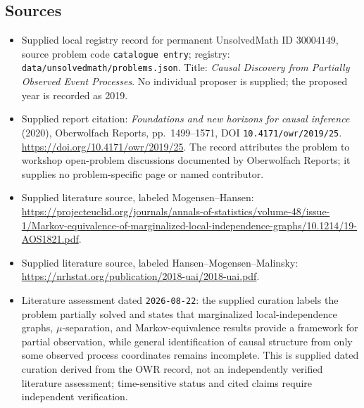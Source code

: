 \documentclass[11pt]{article}
\begin{document}
\subsection{Sources}
\begin{itemize}
\item Supplied local registry record for permanent UnsolvedMath ID \(30004149\), source problem code \texttt{catalogue entry}; registry: \texttt{data/unsolvedmath/problems.json}. Title: \emph{Causal Discovery from Partially Observed Event Processes}. No individual proposer is supplied; the proposed year is recorded as 2019.
\item Supplied report citation: \emph{Foundations and new horizons for causal inference} (2020), Oberwolfach Reports, pp.\ 1499--1571, DOI \texttt{10.4171/owr/2019/25}. \url{https://doi.org/10.4171/owr/2019/25}. The record attributes the problem to workshop open-problem discussions documented by Oberwolfach Reports; it supplies no problem-specific page or named contributor.
\item Supplied literature source, labeled Mogensen--Hansen: \url{https://projecteuclid.org/journals/annals-of-statistics/volume-48/issue-1/Markov-equivalence-of-marginalized-local-independence-graphs/10.1214/19-AOS1821.pdf}.
\item Supplied literature source, labeled Hansen--Mogensen--Malinsky: \url{https://nrhstat.org/publication/2018-uai/2018-uai.pdf}.
\item Literature assessment dated \texttt{2026-08-22}: the supplied curation labels the problem partially solved and states that marginalized local-independence graphs, \(\mu\)-separation, and Markov-equivalence results provide a framework for partial observation, while general identification of causal structure from only some observed process coordinates remains incomplete. This is supplied dated curation derived from the OWR record, not an independently verified literature assessment; time-sensitive status and cited claims require independent verification.
\end{itemize}
\end{document}
